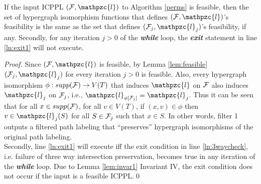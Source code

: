 \documentclass[11pt,letter]{../lib/llncs}
\def\cF{{\cal F}}
\def\cl{\mathpzc{l}}
\begin{document}
\begin{lemma}
  \label{lem:noexit1}
  If the input ICPPL $(\cF, \cl)$ to Algorithm \ref{perms} is
  feasible, then the set of hypergraph isomorphism functions that
  defines $(\cF, \cl)$'s feasibility is the same as the set that
  defines $(\cF_j, \cl_j)$'s feasibility, if any.  Secondly, for any
  iteration $j > 0$ of the {\em \bf while} loop, the {\em \bf exit}
  statement in line \ref{ln:exit1} will not execute.
\end{lemma}
\begin{proof}
  Since $(\cF,\cl)$ is feasible, by Lemma \ref{lem:feasible}
  $(\cF_j,\cl_j)$ for every iteration $j > 0$ is feasible.  %
  Also, every hypergraph isomorphism $\phi: supp(\cF) \rightarrow
  V(T)$ that induces $\cl$ on $\cF$ also induces $\cl_{j}$ on
  $\cF_{j}$, i.e., $\cl_{\phi[\cF_j]} = \cl_j$. Thus it can be seen
  that for all $x \in supp(\cF)$, for all $v \in V(T)$, if $(x,v) \in
  \phi$ then $v \in \cl_{j}(S)$ for all $S \in \cF_{j}$ such that $x
  \in S$.
  In other words, filter 1 outputs a filtered path labeling that ``preserves''
  hypergraph isomorphisms of the original path labeling.\\
  Secondly, line \ref{ln:exit1} will execute iff the exit condition in line
  \ref{ln:3waycheck}, i.e. failure of three way intersection
  preservation, becomes true in any iteration of the {\em \bf while}
  loop.  Due to Lemma \ref{lem:invar1} Invariant IV, the exit
  condition does not occur if the input is a feasible ICPPL.\qed



\end{proof}
\end{document}
